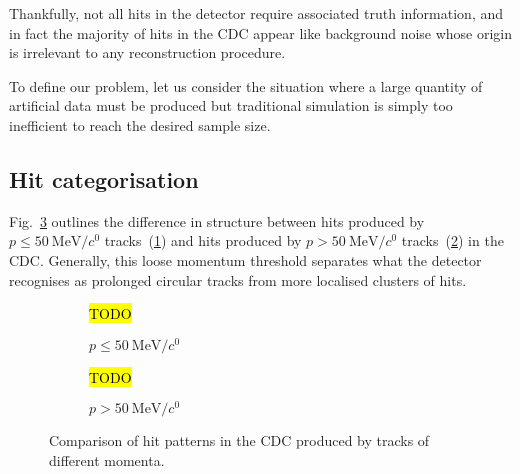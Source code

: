 Thankfully, not all hits in the detector require associated truth information, and in fact the majority of hits in the CDC appear like background noise whose origin is irrelevant to any reconstruction procedure. %

To define our problem, let us consider the situation where a large quantity of artificial data must be produced but traditional simulation is simply too inefficient to reach the desired sample size.


\subsection{Hit categorisation}
Fig.~\ref{fig:cdc_rconst_vs_noise} outlines the difference in structure between hits produced by $p\leq\SI{50}{\MeV/\clight}$ tracks~(\ref{fig:cdc_rconst_vs_noise:low}) and hits produced by $p>\SI{50}{\MeV/\clight}$ tracks~(\ref{fig:cdc_rconst_vs_noise:high}) in the CDC. Generally, this loose momentum threshold separates what the detector recognises as prolonged circular tracks from more localised clusters of hits.

\begin{figure}
    \centering
    \begin{subfigure}{0.4\textwidth}
        \centering
        \hl{TODO}
        \caption{$p\leq\SI{50}{\MeV/\clight}$}
        \label{fig:cdc_rconst_vs_noise:low}
    \end{subfigure}
    \hfill
    \begin{subfigure}{0.4\textwidth}
        \centering
        \hl{TODO}
        \caption{$p > \SI{50}{\MeV/\clight}$}
        \label{fig:cdc_rconst_vs_noise:high}
    \end{subfigure}
    \caption{Comparison of hit patterns in the CDC produced by tracks of different momenta.}
    \label{fig:cdc_rconst_vs_noise}
\end{figure}

